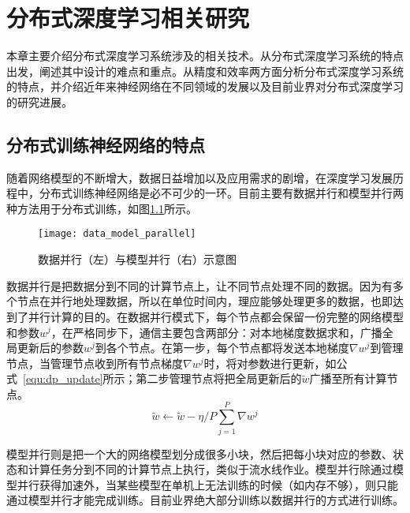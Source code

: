 \chapter{分布式深度学习相关研究}
本章主要介绍分布式深度学习系统涉及的相关技术。从分布式深度学习系统的特点出发，阐述其中设计的难点和重点。从精度和效率两方面分析分布式深度学习系统的特点，并介绍近年来神经网络在不同领域的发展以及目前业界对分布式深度学习的研究进展。
\section{分布式训练神经网络的特点}
随着网络模型的不断增大，数据日益增加以及应用需求的剧增，在深度学习发展历程中，分布式训练神经网络是必不可少的一环。目前主要有数据并行和模型并行两种方法用于分布式训练，如图\ref{fig:data_model_parallel}所示。

\begin{figure}[htp]
\centering
\texttt{[image: data\_model\_parallel]}
\caption{数据并行（左）与模型并行（右）示意图}
\label{fig:data_model_parallel}
\end{figure}
数据并行是把数据分到不同的计算节点上，让不同节点处理不同的数据。因为有多个节点在并行地处理数据，所以在单位时间内，理应能够处理更多的数据，也即达到了并行计算的目的。在数据并行模式下，每个节点都会保留一份完整的网络模型和参数$w^{j}$，在严格同步下，通信主要包含两部分：对本地梯度数据求和，广播全局更新后的参数$w^{j}$到各个节点。在第一步，每个节点都将发送本地梯度$\nabla w^{j}$到管理节点，当管理节点收到所有节点梯度$\nabla w^{j}$时，将对参数进行更新，如公式~\ref{equ:dp_update}所示；第二步管理节点将把全局更新后的$\widetilde w$广播至所有计算节点。
\begin{equation}
\label{equ:dp_update}
\widetilde w \leftarrow \widetilde w - \eta /P \sum^{P}_{j=1}\nabla w^{j}
\end{equation}


模型并行则是把一个大的网络模型划分成很多小块，然后把每小块对应的参数、状态和计算任务分到不同的计算节点上执行，类似于流水线作业。模型并行除通过模型并行获得加速外，当某些模型在单机上无法训练的时候（如内存不够），则只能通过模型并行才能完成训练。目前业界绝大部分训练以数据并行的方式进行训练。

